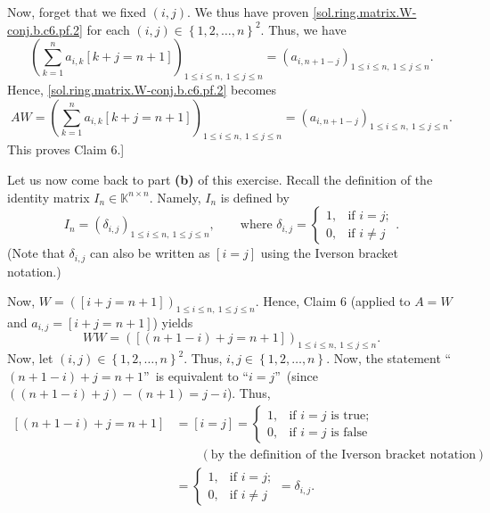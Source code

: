 \documentclass[paper=a4, fontsize=12pt]{scrartcl}%
\let\sumnonlimits\sum
\renewcommand{\sum}{\sumnonlimits\limits}
\theoremstyle{plainsl}
\theoremstyle{definition}
\theoremstyle{remark}
\begin{document}
Now, forget that we fixed $\left(  i,j\right)  $. We thus have proven
\eqref{sol.ring.matrix.W-conj.b.c6.pf.2} for each $\left(  i,j\right)
\in\left\{  1,2,\ldots,n\right\}  ^{2}$. Thus, we have%
\[
\left(  \sum_{k=1}^{n}a_{i,k}\left[  k+j=n+1\right]  \right)  _{1\leq i\leq
n,\ 1\leq j\leq n}=\left(  a_{i,n+1-j}\right)  _{1\leq i\leq n,\ 1\leq j\leq
n}.
\]
Hence, \eqref{sol.ring.matrix.W-conj.b.c6.pf.2} becomes%
\[
AW=\left(  \sum_{k=1}^{n}a_{i,k}\left[  k+j=n+1\right]  \right)  _{1\leq i\leq
n,\ 1\leq j\leq n}=\left(  a_{i,n+1-j}\right)  _{1\leq i\leq n,\ 1\leq j\leq
n}.
\]
This proves Claim 6.]

Let us now come back to part \textbf{(b)} of this exercise. Recall the
definition of the identity matrix $I_{n}\in\mathbb{K}^{n\times n}$. Namely,
$I_{n}$ is defined by
\[
I_{n}=\left(  \delta_{i,j}\right)  _{1\leq i\leq n,\ 1\leq j\leq n}%
,\qquad\text{where }\delta_{i,j}=%
\begin{cases}
1, & \text{if }i=j;\\
0, & \text{if }i\neq j
\end{cases}
.
\]
(Note that $\delta_{i,j}$ can also be written as $\left[  i=j\right]  $ using
the Iverson bracket notation.)

Now, $W=\left(  \left[  i+j=n+1\right]  \right)  _{1\leq i\leq n,\ 1\leq j\leq
n}$. Hence, Claim 6 (applied to $A=W$ and $a_{i,j}=\left[  i+j=n+1\right]  $)
yields%
\begin{equation}
WW=\left(  \left[  \left(  n+1-i\right)  +j=n+1\right]  \right)  _{1\leq i\leq
n,\ 1\leq j\leq n}. \label{sol.ring.matrix.W-conj.b.WW=}%
\end{equation}
Now, let $\left(  i,j\right)  \in\left\{  1,2,\ldots,n\right\}  ^{2}$. Thus,
$i,j\in\left\{  1,2,\ldots,n\right\}  $. Now, the statement \textquotedblleft%
$\left(  n+1-i\right)  +j=n+1$\textquotedblright\ is equivalent to
\textquotedblleft$i=j$\textquotedblright\ (since $\left(  \left(
n+1-i\right)  +j\right)  -\left(  n+1\right)  =j-i$). Thus,%
\begin{align}
\left[  \left(  n+1-i\right)  +j=n+1\right]   &  =\left[  i=j\right]  =%
\begin{cases}
1, & \text{if }i=j\text{ is true;}\\
0, & \text{if }i=j\text{ is false}%
\end{cases}
\nonumber\\
&  \qquad\left(  \text{by the definition of the Iverson bracket notation}%
\right) \nonumber\\
&  =%
\begin{cases}
1, & \text{if }i=j;\\
0, & \text{if }i\neq j
\end{cases}
=\delta_{i,j}. \label{sol.ring.matrix.W-conj.b.1}%
\end{align}
\end{document}
